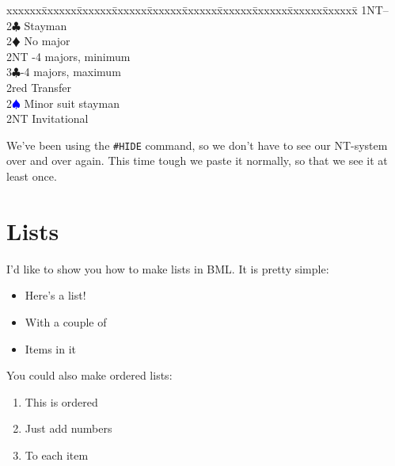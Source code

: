 \documentclass[a4paper]{article}
\newcommand{\BC}{\textcolor{OliveGreen}{$\clubsuit$}}
\newcommand{\BD}{\textcolor{RedOrange}{$\vardiamondsuit$}}
\newcommand{\BS}{\textcolor{Blue}{$\spadesuit${}}}
\newenvironment{bidtable}
{\begin{tabbing}

xxxxxx\=xxxxxx\=xxxxxx\=xxxxxx\=xxxxxx\=xxxxxx\=xxxxxx\=xxxxxx\=xxxxxx\=xxxxxx\=\kill}
{\end{tabbing} }%
\begin{document}
\begin{bidtable}
1NT--\+\\
2\BC \> Stayman\+\\
2\BD \> No major\\
2NT -4 majors, minimum\\
3\BC {}-4 majors, maximum\-\\
2red \> Transfer\\
2\BS \> Minor suit stayman\\
2NT \> Invitational\-
\end{bidtable}

We've been using the \texttt{\#HIDE} command, so we don't have to see our
NT-system over and over again. This time tough we paste it
normally, so that we see it at least once.

\section{Lists}

I'd like to show you how to make lists in BML. It is pretty
simple:

\begin{itemize}
\item Here's a list!

\item With a couple of

\item Items in it

\end{itemize}

You could also make ordered lists:

\begin{enumerate}
\item This is ordered

\item Just add numbers

\item To each item

\end{enumerate}
\end{document}
